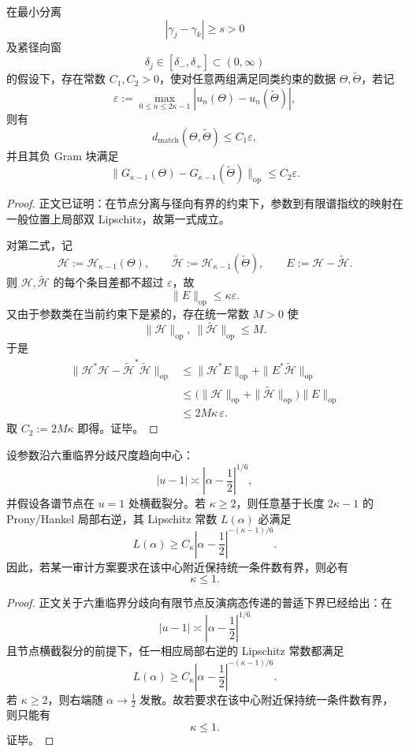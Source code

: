 \begin{proposition}\label{prop:conclusion-comoving-minimal-prefix-local-lipschitz-stability}
在最小分离
\[
|\gamma_j-\gamma_k|\ge s>0
\]
及紧径向窗
\[
\delta_j\in[\delta_-,\delta_+]\subset(0,\infty)
\]
的假设下，存在常数 \(C_1,C_2>0\)，使对任意两组满足同类约束的数据 \(\Theta,\widetilde\Theta\)，若记
\[
\varepsilon:=\max_{0\le n\le 2\kappa-1}|u_n(\Theta)-u_n(\widetilde\Theta)|,
\]
则有
\[
d_{\mathrm{match}}(\Theta,\widetilde\Theta)\le C_1\varepsilon,
\]
并且其负 Gram 块满足
\[
\|G_{\kappa-1}(\Theta)-G_{\kappa-1}(\widetilde\Theta)\|_{\mathrm{op}}
\le
C_2\varepsilon.
\]
\end{proposition}
\begin{proof}
正文已证明：在节点分离与径向有界的约束下，参数到有限谱指纹的映射在一般位置上局部双 Lipschitz，故第一式成立。

对第二式，记
\[
\mathcal H:=\mathcal H_{\kappa-1}(\Theta),
\qquad
\widetilde{\mathcal H}:=\mathcal H_{\kappa-1}(\widetilde\Theta),
\qquad
E:=\mathcal H-\widetilde{\mathcal H}.
\]
则 \(\mathcal H,\widetilde{\mathcal H}\) 的每个条目差都不超过 \(\varepsilon\)，故
\[
\|E\|_{\mathrm{op}}\le \kappa\varepsilon.
\]
又由于参数类在当前约束下是紧的，存在统一常数 \(M>0\) 使
\[
\|\mathcal H\|_{\mathrm{op}},\ \|\widetilde{\mathcal H}\|_{\mathrm{op}}\le M.
\]
于是
\[
\begin{aligned}
\|\mathcal H^*\mathcal H-\widetilde{\mathcal H}^*\widetilde{\mathcal H}\|_{\mathrm{op}}
&\le
\|\mathcal H^*E\|_{\mathrm{op}}+\|E^*\widetilde{\mathcal H}\|_{\mathrm{op}}\\
&\le
\bigl(\|\mathcal H\|_{\mathrm{op}}+\|\widetilde{\mathcal H}\|_{\mathrm{op}}\bigr)\|E\|_{\mathrm{op}}\\
&\le
2M\kappa\,\varepsilon.
\end{aligned}
\]
取 \(C_2:=2M\kappa\) 即得。证毕。
\end{proof}

\begin{theorem}\label{thm:conclusion-comoving-sextic-center-uniform-conditioning-forces-rankone}
设参数沿六重临界分歧尺度趋向中心：
\[
|u-1|\asymp \left|\alpha-\frac12\right|^{1/6},
\]
并假设各谱节点在 \(u=1\) 处横截裂分。若 \(\kappa\ge 2\)，则任意基于长度 \(2\kappa-1\) 的 Prony/Hankel 局部右逆，其 Lipschitz 常数 \(L(\alpha)\) 必满足
\[
L(\alpha)\ge C_\kappa\left|\alpha-\frac12\right|^{-(\kappa-1)/6}.
\]
因此，若某一审计方案要求在该中心附近保持统一条件数有界，则必有
\[
\kappa\le 1.
\]
\end{theorem}
\begin{proof}
正文关于六重临界分歧向有限节点反演病态传递的普适下界已经给出：在
\[
|u-1|\asymp \left|\alpha-\frac12\right|^{1/6}
\]
且节点横截裂分的前提下，任一相应局部右逆的 Lipschitz 常数都满足
\[
L(\alpha)\ge C_\kappa\left|\alpha-\frac12\right|^{-(\kappa-1)/6}.
\]
若 \(\kappa\ge 2\)，则右端随 \(\alpha\to \tfrac12\) 发散。故若要求在该中心附近保持统一条件数有界，则只能有
\[
\kappa\le 1.
\]
证毕。
\end{proof}

